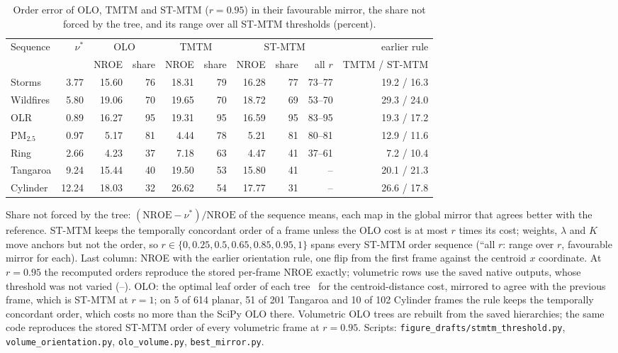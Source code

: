 \begin{table}[H]
\centering\small\setlength{\tabcolsep}{3.2pt}
\caption{Order error of OLO, TMTM and ST-MTM ($r=0.95$) in their favourable mirror, the share not forced by the tree, and its range over all ST-MTM thresholds (percent).}\label{tab:supp_stmtm_threshold}
\begin{tabular}{lrrrrrrrrr}\toprule
Sequence & $\nu^*$ & \multicolumn{2}{c}{OLO} & \multicolumn{2}{c}{TMTM} & \multicolumn{3}{c}{ST-MTM} & earlier rule\\ & & NROE & share & NROE & share & NROE & share & all $r$ & TMTM / ST-MTM\\\midrule
Storms & 3.77 & 15.60 & 76 & 18.31 & 79 & 16.28 & 77 & 73--77 & 19.2 / 16.3\\
Wildfires & 5.80 & 19.06 & 70 & 19.65 & 70 & 18.72 & 69 & 53--70 & 29.3 / 24.0\\
OLR & 0.89 & 16.27 & 95 & 19.31 & 95 & 16.59 & 95 & 83--95 & 19.3 / 17.2\\
PM$_{2.5}$ & 0.97 & 5.17 & 81 & 4.44 & 78 & 5.21 & 81 & 80--81 & 12.9 / 11.6\\
Ring & 2.66 & 4.23 & 37 & 7.18 & 63 & 4.47 & 41 & 37--61 & 7.2 / 10.4\\
Tangaroa & 9.24 & 15.44 & 40 & 19.50 & 53 & 15.80 & 41 & -- & 20.1 / 21.3\\
Cylinder & 12.24 & 18.03 & 32 & 26.62 & 54 & 17.77 & 31 & -- & 26.6 / 17.8\\
\bottomrule\end{tabular}
\par\smallskip\parbox{\linewidth}{\footnotesize Share not forced by the tree: $(\mathrm{NROE}-\nu^*)/\mathrm{NROE}$ of the sequence means, each map in the global mirror that agrees better with the reference. ST-MTM keeps the temporally concordant order of a frame unless the OLO cost is at most $r$ times its cost; weights, $\lambda$ and $K$ move anchors but not the order, so $r\in\{0,0.25,0.5,0.65,0.85,0.95,1\}$ spans every ST-MTM order sequence (``all $r$: range over $r$, favourable mirror for each). Last column: NROE with the earlier orientation rule, one flip from the first frame against the centroid $x$ coordinate. At $r=0.95$ the recomputed orders reproduce the stored per-frame NROE exactly; volumetric rows use the saved native outputs, whose threshold was not varied (--). OLO: the optimal leaf order of each tree~\cite{BarJoseph:2001:OLO} for the centroid-distance cost, mirrored to agree with the previous frame, which is ST-MTM at $r=1$; on 5 of 614 planar, 51 of 201 Tangaroa and 10 of 102 Cylinder frames the rule keeps the temporally concordant order, which costs no more than the SciPy OLO there. Volumetric OLO trees are rebuilt from the saved hierarchies; the same code reproduces the stored ST-MTM order of every volumetric frame at $r=0.95$. Scripts: \texttt{figure\_drafts/stmtm\_threshold.py}, \texttt{volume\_orientation.py}, \texttt{olo\_volume.py}, \texttt{best\_mirror.py}.}
\end{table}
